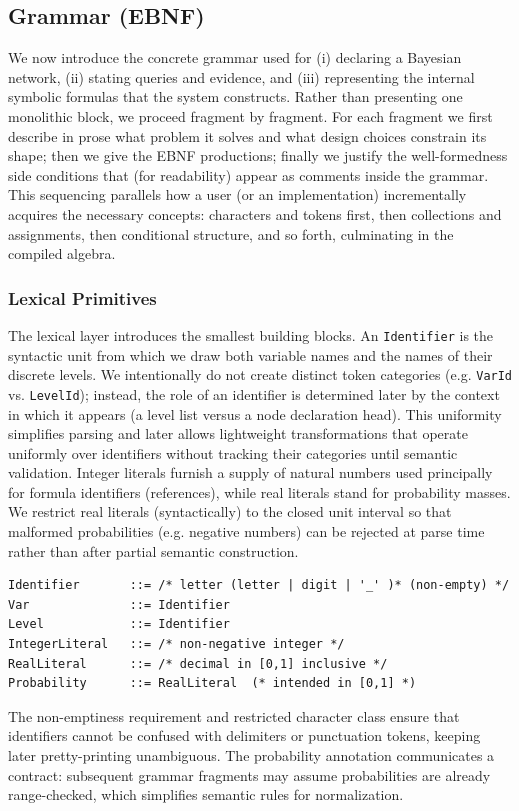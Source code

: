 \documentclass[11pt]{article}
\begin{document}
\subsection{Grammar (EBNF)}
We now introduce the concrete grammar used for (i) declaring a Bayesian network, (ii) stating queries and evidence, and (iii) representing the internal symbolic formulas that the system constructs. Rather than presenting one monolithic block, we proceed fragment by fragment. For each fragment we first describe in prose what problem it solves and what design choices constrain its shape; then we give the EBNF productions; finally we justify the well-formedness side conditions that (for readability) appear as comments inside the grammar. This sequencing parallels how a user (or an implementation) incrementally acquires the necessary concepts: characters and tokens first, then collections and assignments, then conditional structure, and so forth, culminating in the compiled algebra.

\subsubsection{Lexical Primitives}
The lexical layer introduces the smallest building blocks. An \texttt{Identifier} is the syntactic unit from which we draw both variable names and the names of their discrete levels. We intentionally do not create distinct token categories (e.g. \texttt{VarId} vs. \texttt{LevelId}); instead, the role of an identifier is determined later by the context in which it appears (a level list versus a node declaration head). This uniformity simplifies parsing and later allows lightweight transformations that operate uniformly over identifiers without tracking their categories until semantic validation. Integer literals furnish a supply of natural numbers used principally for formula identifiers (references), while real literals stand for probability masses. We restrict real literals (syntactically) to the closed unit interval so that malformed probabilities (e.g. negative numbers) can be rejected at parse time rather than after partial semantic construction.
\begin{lstlisting}[language=EBNF]
Identifier       ::= /* letter (letter | digit | '_' )* (non-empty) */
Var              ::= Identifier
Level            ::= Identifier
IntegerLiteral   ::= /* non-negative integer */
RealLiteral      ::= /* decimal in [0,1] inclusive */
Probability      ::= RealLiteral  (* intended in [0,1] *)
\end{lstlisting}
The non-emptiness requirement and restricted character class ensure that identifiers cannot be confused with delimiters or punctuation tokens, keeping later pretty-printing unambiguous. The probability annotation communicates a contract: subsequent grammar fragments may assume probabilities are already range-checked, which simplifies semantic rules for normalization.
\end{document}
